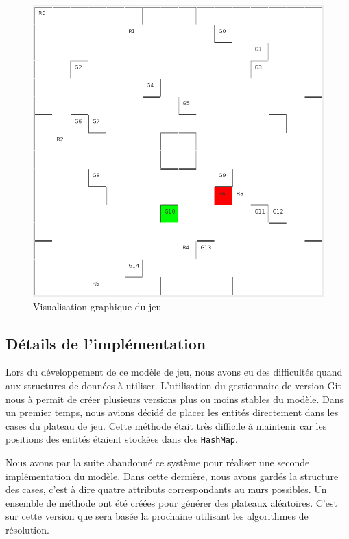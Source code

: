 \documentclass[a4paper]{article} %
\begin{document}
\begin{figure}[htpb]
	\begin{center}
	\includegraphics[scale=0.4]{./images/visuBoard.png}
	\caption{Visualisation graphique du jeu}\label{visuBoard}
	\end{center}
\end{figure}

	\subsection{Détails de l'implémentation}
Lors du développement de ce modèle de jeu, nous avons eu des difficultés quand aux structures de données à utiliser. L'utilisation du gestionnaire de version Git nous à permit de créer plusieurs versions plus ou moins stables du modèle. Dans un premier temps, nous avions décidé de placer les entités directement dans les cases du plateau de jeu. Cette méthode était très difficile à maintenir car les positions des entités étaient stockées dans des \texttt{HashMap}.

Nous avons par la suite abandonné ce système pour réaliser une seconde implémentation du modèle. Dans cette dernière, nous avons gardés la structure des cases, c'est à dire quatre attributs correspondants au murs possibles. Un ensemble de méthode ont été créées pour générer des plateaux aléatoires. C'est sur cette version que sera basée la prochaine utilisant les algorithmes de résolution.
\end{document}

